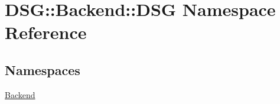 \hypertarget{namespaceDSG_1_1Backend_1_1DSG}{\section{D\+S\+G\+:\+:Backend\+:\+:D\+S\+G Namespace Reference}
\label{namespaceDSG_1_1Backend_1_1DSG}
}
\subsection*{Namespaces}
\begin{DoxyCompactItemize}
\item 
 \hyperlink{namespaceDSG_1_1Backend_1_1DSG_1_1Backend}{Backend}
\end{DoxyCompactItemize}

